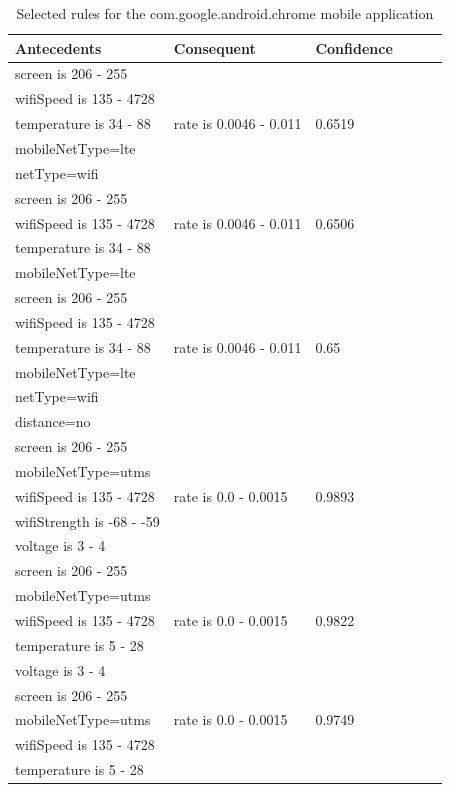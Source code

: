\begin{table} \small%
\begin{tabular}{|p{5.0cm}|p{3.0cm}|p{2.0cm}|p{1.5cm}|p{0.3cm}| p{0.3cm}|}
\hline
Antecedents & Consequent & Confidence \\
\hline
	screen is 206 - 255 			& & \\
	wifiSpeed is 135 - 4728		& & \\ 
	temperature is 34 - 88  		& rate is 0.0046 - 0.011 &  0.6519 \\
	mobileNetType=lte				& & \\
	netType=wifi					& & \\
\hline
	screen is 206 - 255				& & \\
	wifiSpeed is 135 - 4728 		& rate is 0.0046 - 0.011 & 0.6506 \\
	temperature is 34 - 88			& & \\
	mobileNetType=lte				& & \\
\hline
	screen is 206 - 255				& & \\
	wifiSpeed is 135 - 4728 		& & \\
	temperature is 34 - 88			& rate is 0.0046 - 0.011  & 0.65 \\
	mobileNetType=lte				& & \\
	netType=wifi					& & \\
	distance=no						& & \\
\hline
	screen is 206 - 255				& & \\
	mobileNetType=utms				& & \\
	wifiSpeed is 135 - 4728		& rate is 0.0 - 0.0015 & 0.9893 \\
	wifiStrength is -68 - -59		& & \\
	voltage is 3 - 4				& & \\
\hline
	screen is 206 - 255				& & \\
	mobileNetType=utms				& & \\
	wifiSpeed is 135 - 4728		& rate is 0.0 - 0.0015 & 0.9822 \\
	temperature is 5 - 28			& & \\
	voltage is 3 - 4				& & \\
\hline
	screen is 206 - 255				& & \\
	mobileNetType=utms				& rate is 0.0 - 0.0015 & 0.9749 \\
	wifiSpeed is 135 - 4728		& & \\
	temperature is 5 - 28			& & \\
\hline
\end{tabular}
	\caption{Selected rules for the com.google.android.chrome mobile application}
	\label{table:rules-chrome}
\end{table}

